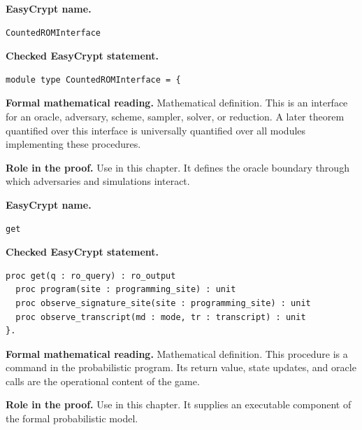 \begin{formaldefinition}
\noindent\textbf{EasyCrypt name.}
\begin{lstlisting}[language=EasyCrypt,basicstyle=\ttfamily\scriptsize]
CountedROMInterface
\end{lstlisting}
\noindent\textbf{Checked EasyCrypt statement.}
\begin{lstlisting}[language=EasyCrypt,basicstyle=\ttfamily\scriptsize]
module type CountedROMInterface = {
\end{lstlisting}
\noindent\textbf{Formal mathematical reading.}
Mathematical definition. This is an interface for an oracle, adversary, scheme, sampler, solver, or reduction.  A later theorem quantified over this interface is universally quantified over all modules implementing these procedures.

\noindent\textbf{Role in the proof.}
Use in this chapter. It defines the oracle boundary through which adversaries and simulations interact.

\end{formaldefinition}

\begin{formaldefinition}
\noindent\textbf{EasyCrypt name.}
\begin{lstlisting}[language=EasyCrypt,basicstyle=\ttfamily\scriptsize]
get
\end{lstlisting}
\noindent\textbf{Checked EasyCrypt statement.}
\begin{lstlisting}[language=EasyCrypt,basicstyle=\ttfamily\scriptsize]
proc get(q : ro_query) : ro_output
  proc program(site : programming_site) : unit
  proc observe_signature_site(site : programming_site) : unit
  proc observe_transcript(md : mode, tr : transcript) : unit
}.
\end{lstlisting}
\noindent\textbf{Formal mathematical reading.}
Mathematical definition. This procedure is a command in the probabilistic program.  Its return value, state updates, and oracle calls are the operational content of the game.

\noindent\textbf{Role in the proof.}
Use in this chapter. It supplies an executable component of the formal probabilistic model.

\end{formaldefinition}

